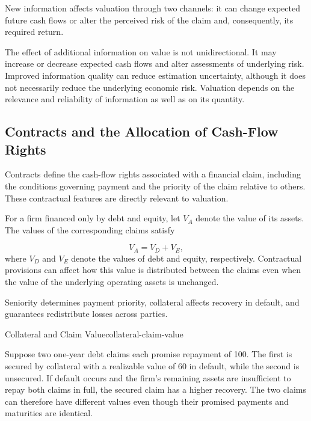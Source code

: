New information affects valuation through two channels: it can change expected future cash flows or alter the perceived risk of the claim and, consequently, its required return.

The effect of additional information on value is not
unidirectional. It may increase or decrease expected
cash flows and alter assessments of underlying risk.
Improved information quality can reduce estimation
uncertainty, although it does not necessarily reduce
the underlying economic risk. Valuation depends on
the relevance and reliability of information as well
as on its quantity.

\subsection{Contracts and the Allocation of Cash-Flow Rights}

Contracts define the cash-flow rights associated with a financial claim, including the conditions governing payment and the priority of the claim relative to others. These contractual features are directly relevant to valuation.

For a firm financed only by debt and equity, let $V_A$ denote the value of its assets. The values of the corresponding claims satisfy

\begin{equation}
V_A=V_D+V_E,
\label{eq:ch5-value-allocation}
\end{equation}
where $V_D$ and $V_E$ denote the values of debt and equity, respectively. Contractual provisions can affect how this value is distributed between the claims even when the value of the underlying operating assets is unchanged.

Seniority determines payment priority, collateral affects recovery in default, and guarantees redistribute losses across parties.

\begin{example}{Collateral and Claim Value}{collateral-claim-value}


Suppose two one-year debt claims each promise repayment of 100. The first is secured by collateral with a realizable value of 60 in default, while the second is unsecured. If default occurs and the firm's remaining assets are insufficient to repay both claims in full, the secured claim has a higher recovery. The two claims can therefore have different values even though their promised payments and maturities are identical.

\end{example}

